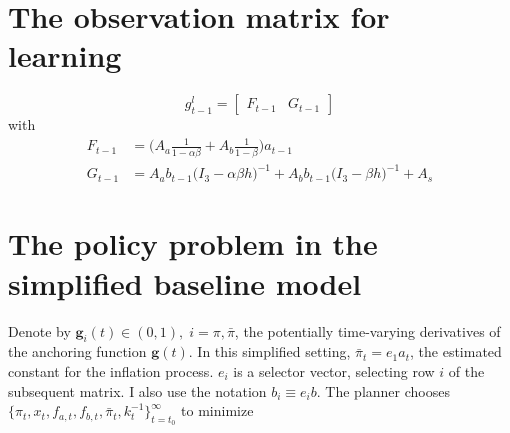 \documentclass[11pt]{article}
\renewcommand{\[}{\begin{equation}}
\renewcommand{\]}{\end{equation}}
\begin{document}
\section{The observation matrix for learning}\label{app_FG}
\begin{equation}
g_{t-1}^l = \begin{bmatrix} F_{t-1} & G_{t-1} \end{bmatrix}
\end{equation}
with
\begin{align}
F_{t-1} & = \bigg(A_a \frac{1}{1-\alpha\beta} + A_b\frac{1}{1-\beta} \bigg)a_{t-1}\\
G_{t-1} & = A_a b_{t-1}\bigg(I_3 - \alpha\beta h \bigg)^{-1} + A_b b_{t-1}\bigg(I_3 - \beta h \bigg)^{-1} + A_s
\end{align}

\section{The policy problem in the simplified baseline model }\label{app_midsimple_problem}
Denote by $\mathbf{g}_i(t) \in (0,1), \; i=\pi, \bar{\pi}$, the potentially time-varying derivatives of the anchoring function $\mathbf{g}(t)$. In this simplified setting, $\bar{\pi}_t = e_1 a_t$, the estimated constant for the inflation process. $e_i$ is a selector vector, selecting row $i$ of the subsequent matrix. I also use the notation $b_i \equiv e_i b$.   The planner chooses $\{\pi_t, x_t, f_{a,t},  f_{b,t}, \bar{\pi}_t, k_t^{-1}\}_{t=t_0}^{\infty}$ to minimize
\end{document}

